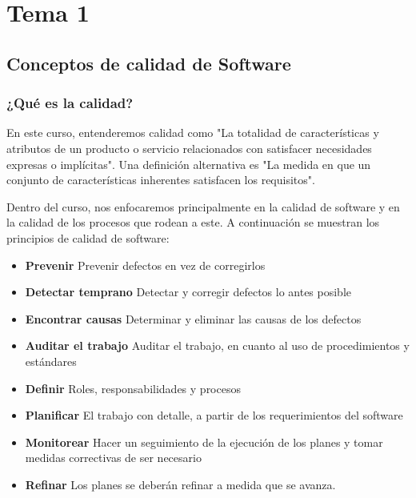 \section*{Tema 1}
    \subsection*{Conceptos de calidad de Software}
        \subsubsection*{¿Qué es la calidad?}
        
            En este curso, entenderemos calidad como "La totalidad de características y atributos de un producto o servicio relacionados con satisfacer necesidades expresas o implícitas". Una definición alternativa es "La medida en que un conjunto de características inherentes satisfacen los requisitos".
            
            Dentro del curso, nos enfocaremos principalmente en la calidad de software y en la calidad de los procesos que rodean a este. A continuación se muestran los principios de calidad de software:
            
            \begin{itemize}
                \item \textbf{Prevenir}
                    Prevenir defectos en vez de corregirlos
                \item \textbf{Detectar temprano}
                    Detectar y corregir defectos lo antes posible
                \item \textbf{Encontrar causas}
                    Determinar y eliminar las causas de los defectos
                \item \textbf{Auditar el trabajo}
                    Auditar el trabajo, en cuanto al uso de procedimientos y estándares
                \item \textbf{Definir}
                    Roles, responsabilidades y procesos
                \item \textbf{Planificar}
                    El trabajo con detalle, a partir de los requerimientos del software
                \item \textbf{Monitorear}
                    Hacer un seguimiento de la ejecución de los planes y tomar medidas correctivas de ser necesario 
                \item \textbf{Refinar}
                    Los planes se deberán refinar a medida que se avanza.
            \end{itemize}
            
